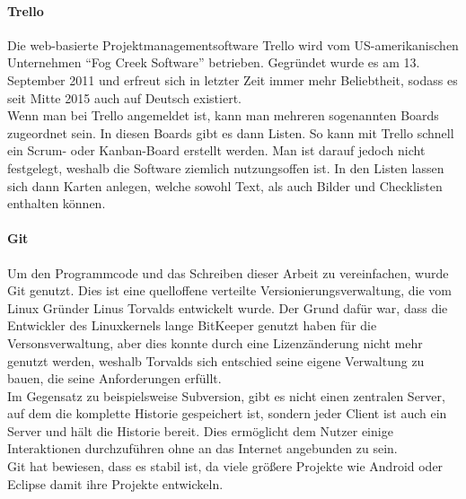   \paragraph{Trello}
  Die web-basierte Projekt\-management\-software Trello wird vom US-amerikanischen Unternehmen
  ``Fog Creek Software'' betrieben. Gegründet wurde es am 13. September 2011 und erfreut sich  in
  letzter Zeit immer mehr Beliebtheit, sodass es seit Mitte 2015 auch auf Deutsch existiert. \\
  Wenn man bei Trello angemeldet ist, kann man mehreren sogenannten Boards zugeordnet sein. In
  diesen Boards gibt es dann Listen. So kann mit Trello schnell ein Scrum- oder Kanban-Board
  erstellt werden. Man ist darauf jedoch nicht festgelegt, weshalb die Software ziemlich
  nutzungsoffen ist. In den Listen lassen sich dann Karten anlegen, welche sowohl Text, als auch
  Bilder und Checklisten enthalten können.

  \paragraph{Git}
  Um den Programmcode und das Schreiben dieser Arbeit zu vereinfachen, wurde Git genutzt. Dies ist
  eine quelloffene verteilte Versionierungsverwaltung, die vom Linux Gründer Linus Torvalds entwickelt
  wurde. Der Grund dafür war, dass die Entwickler des Linuxkernels lange BitKeeper genutzt haben
  für die Versonsverwaltung, aber dies konnte durch eine Lizenzänderung nicht mehr genutzt werden,
  weshalb Torvalds sich entschied seine eigene Verwaltung zu bauen, die seine Anforderungen erfüllt. \\
  Im Gegensatz zu beispielsweise Subversion, gibt es nicht einen zentralen Server, auf dem die komplette
  Historie gespeichert ist, sondern jeder Client ist auch ein Server und hält die Historie bereit. Dies
  ermöglicht dem Nutzer einige Interaktionen durchzuführen ohne an das Internet angebunden zu sein. \\
  Git hat bewiesen, dass es stabil ist, da viele größere Projekte wie Android oder Eclipse damit ihre
  Projekte entwickeln.

